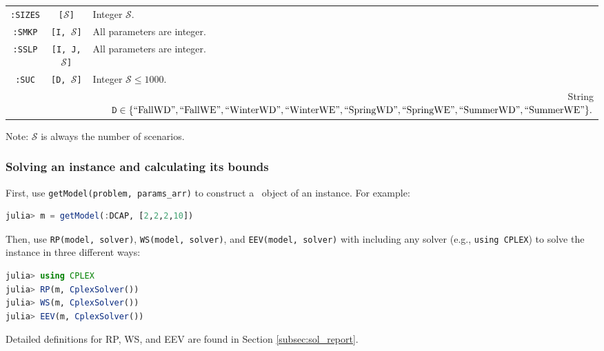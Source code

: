 \begin{table}[H]
{\begin{threeparttable}
\begin{tabular}{@{}ccl@{}}
				\texttt{:SIZES}              & \texttt{[$\mathcal{S}$]}          & Integer $\mathcal{S}$.                                                                                   \\
				\texttt{:SMKP}               & \texttt{[I, $\mathcal{S}$]}       & All parameters are integer.                                                                                                                \\
				\texttt{:SSLP}               & \texttt{[I, J, $\mathcal{S}$]}    & All parameters are integer.                                                                                                                \\
				\texttt{:SUC}                & \texttt{[D, $\mathcal{S}$]}       & \multicolumn{1}{l}{Integer $\mathcal{S}\le 1000$.}                                             \\
				\multicolumn{1}{l}{}         & \multicolumn{1}{l}{}            & \multicolumn{1}{r}{String $\texttt{D}\in \{\mathrm{``FallWD"}, \mathrm{``FallWE"}, \mathrm{``WinterWD"}, \mathrm{``WinterWE"}, \mathrm{``SpringWD"}, \mathrm{``SpringWE"}, \mathrm{``SummerWD"}, \mathrm{``SummerWE"} \}.$}\\				
				\bottomrule
			\end{tabular}
			\begin{tablenotes}
				\item Note: $\mathcal{S}$ is always the number of scenarios.
			\end{tablenotes}
		\end{threeparttable}
	}
\end{table}

\subsubsection{Solving an instance and calculating its bounds}
First, use \texttt{getModel(problem, params\_arr)} to construct a \jumpmodel\ object of an instance. For example:
\begin{lstlisting}[frame=single,language=julia]
julia> m = getModel(:DCAP, [2,2,2,10])
\end{lstlisting}
Then, use \texttt{RP(model, solver)}, \texttt{WS(model, solver)}, and \texttt{EEV(model, solver)} with including any solver (e.g., \texttt{using CPLEX}) to solve the instance in three different ways:
\begin{lstlisting}[frame=single,language=julia]
julia> using CPLEX
julia> RP(m, CplexSolver())
julia> WS(m, CplexSolver())
julia> EEV(m, CplexSolver())
\end{lstlisting}
Detailed definitions for RP, WS, and EEV are found in Section \ref{subsec:sol_report}.

